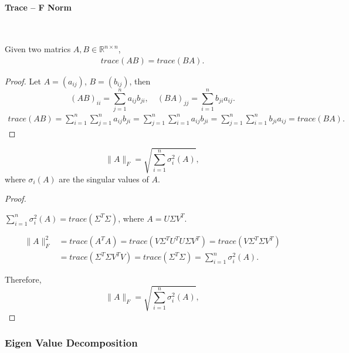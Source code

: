 \paragraph{Trace -- F Norm}

\

Given two matrics  $A, B \in \mathbb{R}^{n \times n}$,
\begin{align}
trace(AB) = trace(BA).
\end{align}
\begin{proof}
Let $A = (a_{ij})$, $B = (b_{ij})$, then
\[
(AB)_{ii} = \sum_{j = 1}^n a_{i j} b_{j i},  \quad   (BA)_{j j} = \sum_{i = 1}^n  b_{j i} a_{i j}.
\]
\begin{align*}
trace(AB) = \sum_{i = 1}^n \sum_{j = 1}^n a_{i j} b_{j i}
= \sum_{j = 1}^n  \sum_{i = 1}^n a_{i j} b_{j i}
= \sum_{j = 1}^n  \sum_{i = 1}^n  b_{j i}  a_{i j}
= trace(BA).
\end{align*}
\end{proof}


\[
\| A \|_F =  \sqrt{ \sum_{i = 1}^n \sigma_i^2 (A) },
\]
where  $ \sigma _{i}(A) $  are the singular values of $A$.


\begin{proof}\cite{mukhopadhyay2015}


$ \sum_{i = 1}^n \sigma_i^2 (A)  = trace(\Sigma^T \Sigma)$, where $ A = U \Sigma V^T $.

\begin{align*}
\| A \|_F^2 &= trace(A^T A)
 = trace( V \Sigma^T U^T U \Sigma V^T )
 = trace( V \Sigma^T  \Sigma V^T ) \\
& = trace( \Sigma^T  \Sigma V^T V  )
 = trace( \Sigma^T  \Sigma  )
 = \sum_{i = 1}^n \sigma_i^2 (A).
\end{align*}

Therefore,
\[
\| A \|_F =  \sqrt{ \sum_{i = 1}^n \sigma_i^2 (A) },
\]

\end{proof}




\subsubsection{Eigen Value Decomposition}

